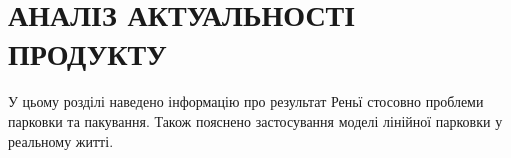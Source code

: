 \chapter{АНАЛІЗ АКТУАЛЬНОСТІ ПРОДУКТУ} 

\hspace{10pt}

У цьому розділі наведено інформацію про результат Реньї стосовно проблеми парковки та пакування. Також пояснено застосування моделі лінійної парковки у реальному житті.




	